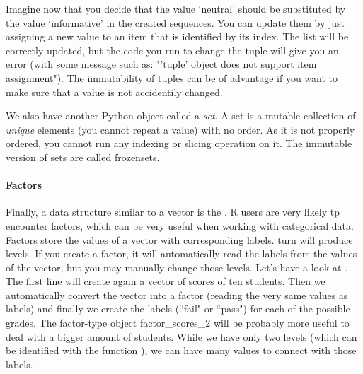 
Imagine now that you decide that the value `neutral' should be
substituted by the value `informative' in the created sequences. You
can update them by just assigning a new value to an item that is
identified by its index.  The list will be correctly updated, but the
code you run to change the tuple will give you an error (with some
message such as: "'tuple' object does not support item
assignment"). The immutability of tuples can be of advantage if you
want to make sure that a value is not accidentily changed.

We also have another Python object called a \emph{set}. A set is a mutable
collection of \emph{unique} elements (you cannot repeat a value) with
no order. As it is not properly ordered, you cannot run any indexing
or slicing operation on it. The immutable version of sets are called
frozensets.





\paragraph{Factors}

Finally, a data structure similar to a vector is the .
R users are very likely tp encounter factors, which can be very useful when
working with categorical data. Factors
store the values of a vector with corresponding labels.%
turn will produce levels.
If you create a factor, it will
automatically read the labels from the values of the vector, but you
may manually change those levels. Let's have a look at
.  The first line will create again a vector of scores
of ten students. Then we automatically convert the vector into a
factor (reading the very same values as labels) and finally we create
the labels (``fail" or ``pass") for each of the possible grades.  The
factor-type object factor\_scores\_2 will be probably more useful to
deal with a bigger amount of students. While we have only two levels
(which can be identified with the function ), we can have many
values to connect with those labels.

